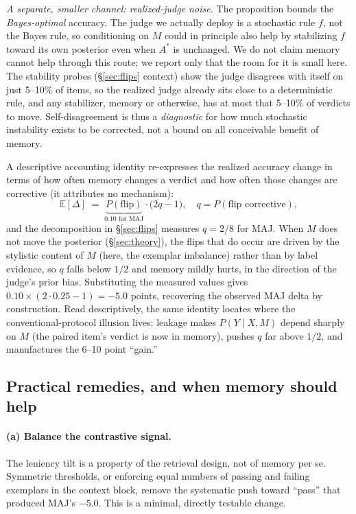 \documentclass[]{ceurart}
\begin{document}
\emph{A separate, smaller channel: realized-judge noise.} The proposition bounds the \emph{Bayes-optimal} accuracy. The judge we actually deploy is a stochastic rule $f$, not the Bayes rule, so conditioning on $M$ could in principle also help by stabilizing $f$ toward its own posterior even when $A^*$ is unchanged. We do not claim memory cannot help through this route; we report only that the room for it is small here. The stability probes (\S\ref{sec:flips} context) show the judge disagrees with itself on just 5--10\% of items, so the realized judge already sits close to a deterministic rule, and any stabilizer, memory or otherwise, has at most that 5--10\% of verdicts to move. Self-disagreement is thus a \emph{diagnostic} for how much stochastic instability exists to be corrected, not a bound on all conceivable benefit of memory.

A descriptive accounting identity re-expresses the realized accuracy change in terms of how often memory changes a verdict and how often those changes are corrective (it attributes no mechanism):
\[
\mathbb{E}[\Delta] \;=\; \underbrace{P(\text{flip})}_{0.10 \text{ for MAJ}} \cdot \bigl(2q - 1\bigr), \quad q = P(\text{flip corrective}),
\]
and the decomposition in \S\ref{sec:flips} measures $q = 2/8$ for MAJ. When $M$ does not move the posterior (\S\ref{sec:theory}), the flips that do occur are driven by the stylistic content of $M$ (here, the exemplar imbalance) rather than by label evidence, so $q$ falls below $1/2$ and memory mildly hurts, in the direction of the judge's prior bias. Substituting the measured values gives $0.10 \times (2 \cdot 0.25 - 1) = -5.0$ points, recovering the observed MAJ delta by construction. Read descriptively, the same identity locates where the conventional-protocol illusion lives: leakage makes $P(Y\mid X,M)$ depend sharply on $M$ (the paired item's verdict is now in memory), pushes $q$ far above $1/2$, and manufactures the 6--10 point ``gain.''

\subsection{Practical remedies, and when memory should help}
\label{sec:remedies}


\paragraph{(a) Balance the contrastive signal.} The leniency tilt is a property of the retrieval design, not of memory per se. Symmetric thresholds, or enforcing equal numbers of passing and failing exemplars in the context block, remove the systematic push toward ``pass'' that produced MAJ's $-5.0$. This is a minimal, directly testable change.
\end{document}

